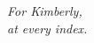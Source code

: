 \thispagestyle{empty}
\begin{center}
\textit{For Kimberly,}\\[1em]
\textit{at every index.}
\end{center}
